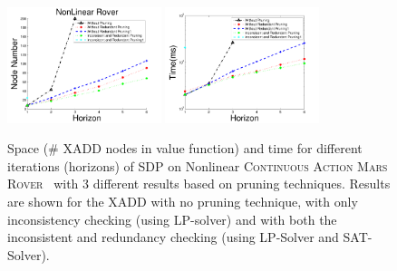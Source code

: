 \documentclass[twoside,11pt]{article}
\newcommand{\MarsRover}{\textsc{Mars Rover }}
\begin{document}
\begin{figure}[t]
\centering
\includegraphics[width=0.4\textwidth]{Figures2/camdp/contRoverNode.pdf}
\hspace{5mm}
\includegraphics[width=0.4\textwidth]{Figures2/camdp/contRoverTime.pdf}
\vspace{-3mm}
\caption{%
Space (\# XADD nodes in value function) and
time for different iterations (horizons) of SDP on Nonlinear \textsc{Continuous Action}  \MarsRover\ with 3 different results based on pruning techniques. Results are shown for  the XADD 
 with no pruning technique, with only inconsistency checking (using LP-solver) and with both the inconsistent and redundancy checking (using LP-Solver and SAT-Solver).}
\label{fig:roverTS}
\vspace{-6mm}
\end{figure}
\end{document}
